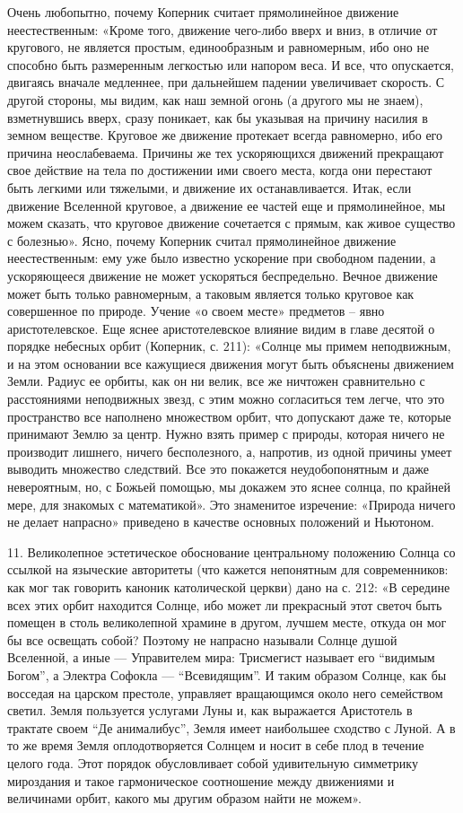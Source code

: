 Очень любопытно, почему Коперник считает прямолинейное движение
неестественным: «Кроме того, движение чего-либо вверх и вниз, в
отличие от кругового, не является простым, единообразным и
равномерным, ибо оно не способно быть размеренным легкостью или
напором веса. И все, что опускается, двигаясь вначале медленнее, при
дальнейшем падении увеличивает скорость. С другой стороны, мы видим,
как наш земной огонь (а другого мы не знаем), взметнувшись вверх,
сразу поникает, как бы указывая на причину насилия в земном веществе.
Круговое же движение протекает всегда равномерно, ибо его причина
неослабеваема. Причины же тех ускоряющихся движений прекращают свое
действие на тела по достижении ими своего места, когда они перестают
быть легкими или тяжелыми, и движение их останавливается. Итак, если
движение Вселенной круговое, а движение ее частей еще и прямолинейное,
мы можем сказать, что круговое движение сочетается с прямым, как живое
существо с болезнью». Ясно, почему Коперник считал прямолинейное
движение неестественным: ему уже было известно ускорение при свободном
падении, а ускоряющееся движение не может ускоряться беспредельно.
Вечное движение может быть только равномерным, а таковым является
только круговое как совершенное по природе. Учение «о своем месте»
предметов -- явно аристотелевское. Еще яснее аристотелевское влияние
видим в главе десятой о порядке небесных орбит (Коперник, с. 211):
«Солнце мы примем неподвижным, и на этом основании все кажущиеся
движения могут быть объяснены движением Земли. Радиус ее орбиты, как
он ни велик, все же ничтожен сравнительно с расстояниями неподвижных
звезд, с этим можно согласиться тем легче, что это пространство все
наполнено множеством орбит, что допускают даже те, которые принимают
Землю за центр. Нужно взять пример с природы, которая ничего не
производит лишнего, ничего бесполезного, а, напротив, из одной причины
умеет выводить множество следствий. Все это покажется неудобопонятным
и даже невероятным, но, с Божьей помощью, мы докажем это яснее солнца,
по крайней мере, для знакомых с математикой». Это знаменитое
изречение: «Природа ничего не делает напрасно» приведено в качестве
основных положений и Ньютоном.

11. Великолепное эстетическое обоснование центральному положению
Солнца со ссылкой на языческие авторитеты (что кажется непонятным для
современников: как мог так говорить каноник католической церкви) дано
на с. 212: «В середине всех этих орбит находится Солнце, ибо может ли
прекрасный этот светоч быть помещен в столь великолепной храмине в
другом, лучшем месте, откуда он мог бы все освещать собой? Поэтому не
напрасно называли Солнце душой Вселенной, а иные --- Управителем мира:
Трисмегист называет его ``видимым Богом'', а Электра Софокла ---
``Всевидящим''. И таким образом Солнце, как бы восседая на царском
престоле, управляет вращающимся около него семейством светил. Земля
пользуется услугами Луны и, как выражается Аристотель в трактате своем
``Де анималибус'', Земля имеет наибольшее сходство с Луной. А в то же
время Земля оплодотворяется Солнцем и носит в себе плод в течение
целого года. Этот порядок обусловливает собой удивительную симметрику
мироздания и такое гармоническое соотношение между движениями и
величинами орбит, какого мы другим образом найти не можем».

